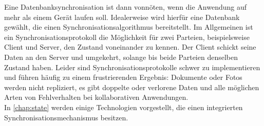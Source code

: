 Eine Datenbanksynchronisation ist dann vonnöten, wenn die Anwendung auf mehr als einem Gerät laufen soll.
Idealerweise wird hierfür eine Datenbank gewählt, die einen Synchronisationsalgorithmus bereitstellt.
Im Allgemeinen ist ein Synchronisationsprotokoll die Möglichkeit für zwei Parteien, beispielsweise Client und Server, den Zustand voneinander zu kennen. Der Client schickt seine Daten an den Server und umgekehrt, solange bis beide Parteien denselben Zustand haben.
Leider sind Synchronisationsprotokolle schwer zu implementieren und führen häufig zu einem frustrierenden Ergebnis: Dokumente oder Fotos werden nicht repliziert, es gibt doppelte oder verlorene Daten und alle möglichen Arten von Fehlverhalten bei kollaborativen Anwendungen.\\
In \autoref{chap:state} werden einige Technologien vorgestellt, die einen integrierten Synchronisationsmechanismus besitzen.

